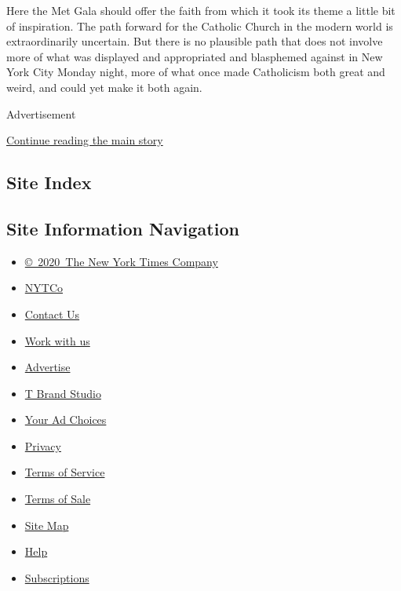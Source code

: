 Here the Met Gala should offer the faith from which it took its theme a
little bit of inspiration. The path forward for the Catholic Church in
the modern world is extraordinarily uncertain. But there is no plausible
path that does not involve more of what was displayed and appropriated
and blasphemed against in New York City Monday night, more of what once
made Catholicism both great and weird, and could yet make it both again.

Advertisement

\protect\hyperlink{after-bottom}{Continue reading the main story}

\hypertarget{site-index}{%
\subsection{Site Index}\label{site-index}}

\hypertarget{site-information-navigation}{%
\subsection{Site Information
Navigation}\label{site-information-navigation}}

\begin{itemize}
\tightlist
\item
  \href{https://help.nytimes3xbfgragh.onion/hc/en-us/articles/115014792127-Copyright-notice}{©~2020~The
  New York Times Company}
\end{itemize}

\begin{itemize}
\tightlist
\item
  \href{https://www.nytco.com/}{NYTCo}
\item
  \href{https://help.nytimes3xbfgragh.onion/hc/en-us/articles/115015385887-Contact-Us}{Contact
  Us}
\item
  \href{https://www.nytco.com/careers/}{Work with us}
\item
  \href{https://nytmediakit.com/}{Advertise}
\item
  \href{http://www.tbrandstudio.com/}{T Brand Studio}
\item
  \href{https://www.nytimes3xbfgragh.onion/privacy/cookie-policy\#how-do-i-manage-trackers}{Your
  Ad Choices}
\item
  \href{https://www.nytimes3xbfgragh.onion/privacy}{Privacy}
\item
  \href{https://help.nytimes3xbfgragh.onion/hc/en-us/articles/115014893428-Terms-of-service}{Terms
  of Service}
\item
  \href{https://help.nytimes3xbfgragh.onion/hc/en-us/articles/115014893968-Terms-of-sale}{Terms
  of Sale}
\item
  \href{https://spiderbites.nytimes3xbfgragh.onion}{Site Map}
\item
  \href{https://help.nytimes3xbfgragh.onion/hc/en-us}{Help}
\item
  \href{https://www.nytimes3xbfgragh.onion/subscription?campaignId=37WXW}{Subscriptions}
\end{itemize}
